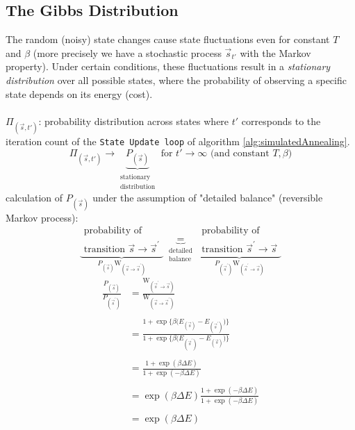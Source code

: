 \subsection{The Gibbs Distribution}
The random (noisy) state changes cause state fluctuations even for
constant $T$ and $\beta$ (more precisely we have a stochastic process $\vec{s}_{t'}$ with the Markov property). Under certain conditions, these fluctuations
result in a \emph{stationary distribution} over all possible states,
where the probability of observing a specific state depends on its
energy (cost).
\\\\
$\Pi_{(\vec{s}, t')}$: probability distribution across states where $t'$ corresponds to the iteration 
count of the \texttt{State Update loop} of algorithm \ref{alg:simulatedAnnealing}.
\begin{equation}
	\Pi_{(\vec{s}, t')} \rightarrow 
	\underbrace{ P_{(\vec{s})} }_{ \substack{ 	\text{stationary} \\
							\text{distribution}} }
	\text{ for }
	t' \rightarrow \infty \text{ (and constant } T, \beta \text{)}
\end{equation}
calculation of $P_{(\vec{s})}$ under the assumption of "detailed balance" (reversible Markov process): 
\begin{equation}
	\underbrace{ \substack{	\text{probability of} \\
				\text{transition } 
				\vec{s} \rightarrow \vec{s}^{'}} }_{
			P_{(\vec{s})} \mathrm{W}_{(\vec{s} \rightarrow
				\vec{s}^{'})} }
	\underbrace{ = }_{ \substack{	\text{detailed} \\
					\text{balance}}}
	\underbrace{ \substack{	\text{probability of} \\
				\text{transition } 
				\vec{s}^{'} \rightarrow \vec{s} } }_{
			P_{(\vec{s}^{'})} \mathrm{W}_{(\vec{s}^{'} \rightarrow
				\vec{s})} }
\end{equation}
\begin{equation}
	\begin{array}{ll}
	\frac{P_{(\vec{s})}}{P_{(\vec{s}^{'})}}
	& = \frac{\mathrm{W}_{(\vec{s}^{'} \rightarrow \vec{s})}}{
		\mathrm{W}_{(\vec{s} \rightarrow \vec{s}^{'})}} \\\\
	& = \frac{1 + \exp\big\{ \beta \big( E_{(\vec{s})} - E_{(\vec{s}^{'})}
		\big) \big\} }{1 + \exp\big\{ \beta \big( E_{(\vec{s}^{'})} - 
		E_{(\vec{s})}\big) \big\} } \\\\
	& = \frac{1 + \exp( \beta \Delta E)}{1 + \exp( -\beta \Delta E)} \\\\
	& = \exp( \beta \Delta E) \frac{1 + \exp( -\beta \Delta E)}{
		1 + \exp( -\beta \Delta E) } \\\\
	& = \exp( \beta \Delta E )
	\end{array}
\end{equation}
